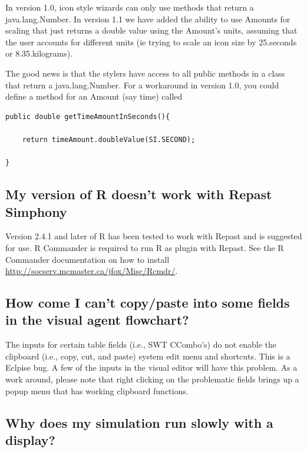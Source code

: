 \documentclass[11pt]{article}
\begin{document}
In version 1.0, icon style wizards can only use methods that return a java.lang.Number. In version 1.1 we have added the ability to use Amounts for scaling that just returns a double value using the Amount's units, assuming that the user accounts for different units (ie trying to scale an icon size by 25.seconds or 8.35.kilograms).

The good news is that the stylers have access to all public methods in a class that return a java.lang.Number. For a workaround in version 1.0, you could define a method for an Amount (say time) called

\noindent\begin{minipage}[h]{\textwidth}
\vspace{.2in}
\lstset{language=java}
\begin{lstlisting}
public double getTimeAmountInSeconds(){

	return timeAmount.doubleValue(SI.SECOND);

}
\end{lstlisting}
\vspace{.2in}
\end{minipage}


\subsection{My version of R doesn't work with Repast Simphony}
\label{p:r}
Version 2.4.1 and later of R has been tested to work with Repast and is suggested for use. R Commander is required to run R as plugin with Repast. See the R Commander documentation on how to install \url{http://socserv.mcmaster.ca/jfox/Misc/Rcmdr/}.

\subsection{How come I can't copy/paste into some fields in the visual agent flowchart?}
\label{p:copy_paste}

The inputs for certain table fields (i.e., SWT CCombo's) do not enable the clipboard (i.e., copy, cut, and paste) system edit menu and shortcuts. This is a Eclpise bug. A few of the inputs in the visual editor will have this problem. As a work around, please note that right clicking on the problematic fields brings up a popup menu that has working clipboard functions.

\subsection{Why does my simulation run slowly with a display?}
\label{p:slow}
\end{document}
